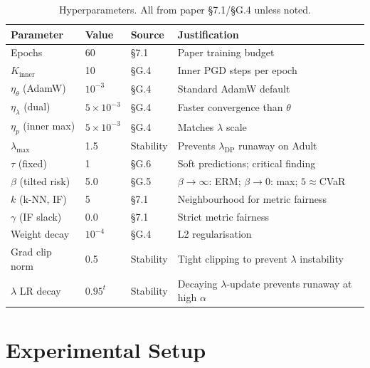 \documentclass[11pt,a4paper]{article}
\newcommand{\lDP}{\lambda_{\mathrm{DP}}}
\begin{document}
\begin{table}[h]
\centering\small
\caption{Hyperparameters.  All from paper \S7.1/\S G.4 unless noted.}
\label{tab:hyperparams}
\begin{tabular}{L{3.5cm}C{1.8cm}C{1.5cm}L{7.5cm}}
\toprule
{}
\color{white}\textbf{Parameter} &
\color{white}\textbf{Value} &
\color{white}\textbf{Source} &
\color{white}\textbf{Justification} \\
\midrule
Epochs                   & 60               & \S7.1     & Paper training budget \\
$K_{\mathrm{inner}}$     & 10               & \S G.4    & Inner PGD steps per epoch \\
$\eta_\theta$ (AdamW)    & $10^{-3}$        & \S G.4    & Standard AdamW default \\
$\eta_\lambda$ (dual)    & $5\times10^{-3}$ & \S G.4    & Faster convergence than $\theta$ \\
$\eta_p$ (inner max)     & $5\times10^{-3}$ & \S G.4    & Matches $\lambda$ scale \\
$\lambda_{\max}$         & 1.5              & Stability & Prevents $\lDP$ runaway on Adult \\
$\tau$ (fixed)             & 1                & \S G.6    & Soft predictions; critical finding \\
$\beta$ (tilted risk)    & 5.0              & \S G.5    & $\beta\to\infty$: ERM;\; $\beta\to 0$: max;\; $5\approx$CVaR \\
$k$ (k-NN, IF)           & 5                & \S7.1     & Neighbourhood for metric fairness \\
$\gamma$ (IF slack)      & 0.0              & \S7.1     & Strict metric fairness \\
Weight decay             & $10^{-4}$        & \S G.4    & L2 regularisation \\
Grad clip norm           & 0.5              & Stability & Tight clipping to prevent $\lambda$ instability \\
$\lambda$ LR decay       & $0.95^t$         & Stability & Decaying $\lambda$-update prevents runaway at high $\alpha$ \\
\bottomrule
\end{tabular}
\end{table}

\section{Experimental Setup}
\end{document}
